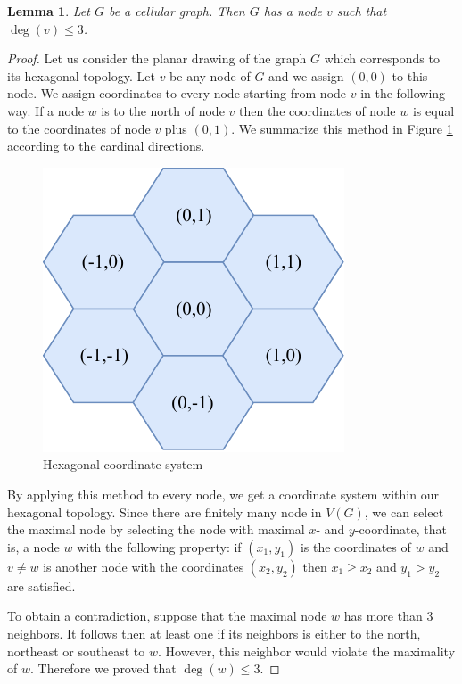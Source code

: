 \documentclass[a4paper, 12pt]{article}
\newtheorem{lem}{Lemma}[section]
\begin{document}

\begin{lem}\label{lem:degree-constraint}
Let $G$ be a cellular graph. Then $G$ has a node $v$ such that $\deg(v) \leqslant 3$.
\end{lem}

\begin{proof} Let us consider the planar drawing of the graph $G$ which corresponds to its hexagonal topology.
Let $v$ be any node of $G$ and we assign $(0,0)$ to this node. We assign coordinates to every node starting from node $v$ in the following way. If a node $w$ is to the north of node $v$ then the coordinates of node $w$ is equal to the coordinates of node $v$ plus $(0,1)$. We summarize this method in Figure \ref{fig:assignment} according to the cardinal directions.
\begin{figure}[!h]
\centering
\includegraphics[scale=1]{figures/hexagonal-coordinate-system.pdf}
\caption{Hexagonal coordinate system}\label{fig:assignment}
\end{figure}
By applying this method to every node, we get a coordinate system within our hexagonal topology. Since there are finitely many node in $V(G)$, we can select the maximal node by selecting the node with maximal $x$- and $y$-coordinate, that is, a node $w$ with the following property: if $(x_1,y_1)$ is the coordinates of $w$ and $v \neq w$ is another node with the coordinates $(x_2,y_2)$ then $x_1 \geqslant x_2$ and $y_1 > y_2$ are satisfied.

To obtain a contradiction, suppose that the maximal node $w$ has more than 3 neighbors. It follows then at least one if its neighbors is either to the north, northeast or southeast to $w$. However, this neighbor would violate the maximality of $w$. Therefore we proved that $\deg(w) \leqslant 3$.
\end{proof}
\end{document}
